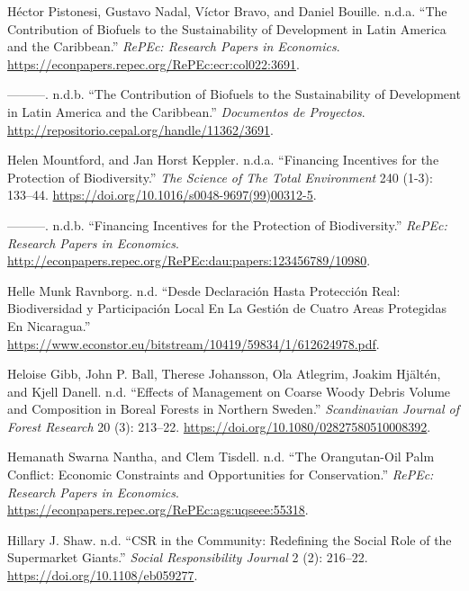 \begin{CSLReferences}{1}{0}
Héctor Pistonesi, Gustavo Nadal, Víctor Bravo, and Daniel Bouille.
n.d.a. {``The Contribution of Biofuels to the Sustainability of
Development in Latin America and the Caribbean.''} \emph{RePEc: Research
Papers in Economics}.
\url{https://econpapers.repec.org/RePEc:ecr:col022:3691}.

---------. n.d.b. {``The Contribution of Biofuels to the Sustainability
of Development in Latin America and the Caribbean.''} \emph{Documentos
de Proyectos}. \url{http://repositorio.cepal.org/handle/11362/3691}.

Helen Mountford, and Jan Horst Keppler. n.d.a. {``Financing Incentives
for the Protection of Biodiversity.''} \emph{The Science of The Total
Environment} 240 (1-3): 133--44.
\url{https://doi.org/10.1016/s0048-9697(99)00312-5}.

---------. n.d.b. {``Financing Incentives for the Protection of
Biodiversity.''} \emph{RePEc: Research Papers in Economics}.
\url{http://econpapers.repec.org/RePEc:dau:papers:123456789/10980}.

Helle Munk Ravnborg. n.d. {``Desde Declaración Hasta Protección Real:
Biodiversidad y Participación Local En La Gestión de Cuatro Areas
Protegidas En Nicaragua.''}
\url{https://www.econstor.eu/bitstream/10419/59834/1/612624978.pdf}.

Heloise Gibb, John P. Ball, Therese Johansson, Ola Atlegrim, Joakim
Hjältén, and Kjell Danell. n.d. {``Effects of Management on Coarse Woody
Debris Volume and Composition in Boreal Forests in Northern Sweden.''}
\emph{Scandinavian Journal of Forest Research} 20 (3): 213--22.
\url{https://doi.org/10.1080/02827580510008392}.

Hemanath Swarna Nantha, and Clem Tisdell. n.d. {``The Orangutan-Oil Palm
Conflict: Economic Constraints and Opportunities for Conservation.''}
\emph{RePEc: Research Papers in Economics}.
\url{https://econpapers.repec.org/RePEc:ags:uqseee:55318}.

Hillary J. Shaw. n.d. {``CSR in the Community: Redefining the Social
Role of the Supermarket Giants.''} \emph{Social Responsibility Journal}
2 (2): 216--22. \url{https://doi.org/10.1108/eb059277}.


\end{CSLReferences}
